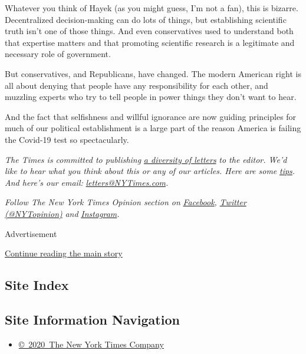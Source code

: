 Whatever you think of Hayek (as you might guess, I'm not a fan), this is
bizarre. Decentralized decision-making can do lots of things, but
establishing scientific truth isn't one of those things. And even
conservatives used to understand both that expertise matters and that
promoting scientific research is a legitimate and necessary role of
government.

But conservatives, and Republicans, have changed. The modern American
right is all about denying that people have any responsibility for each
other, and muzzling experts who try to tell people in power things they
don't want to hear.

And the fact that selfishness and willful ignorance are now guiding
principles for much of our political establishment is a large part of
the reason America is failing the Covid-19 test so spectacularly.

\emph{The Times is committed to publishing}
\href{https://www.nytimes3xbfgragh.onion/2019/01/31/opinion/letters/letters-to-editor-new-york-times-women.html}{\emph{a
diversity of letters}} \emph{to the editor. We'd like to hear what you
think about this or any of our articles. Here are some}
\href{https://help.nytimes3xbfgragh.onion/hc/en-us/articles/115014925288-How-to-submit-a-letter-to-the-editor}{\emph{tips}}\emph{.
And here's our email:}
\href{mailto:letters@NYTimes.com}{\emph{letters@NYTimes.com}}\emph{.}

\emph{Follow The New York Times Opinion section on}
\href{https://www.facebookcorewwwi.onion/nytopinion}{\emph{Facebook}}\emph{,}
\href{http://twitter.com/NYTOpinion}{\emph{Twitter (@NYTopinion)}}
\emph{and}
\href{https://www.instagram.com/nytopinion/}{\emph{Instagram}}\emph{.}

Advertisement

\protect\hyperlink{after-bottom}{Continue reading the main story}

\hypertarget{site-index}{%
\subsection{Site Index}\label{site-index}}

\hypertarget{site-information-navigation}{%
\subsection{Site Information
Navigation}\label{site-information-navigation}}

\begin{itemize}
\tightlist
\item
  \href{https://help.nytimes3xbfgragh.onion/hc/en-us/articles/115014792127-Copyright-notice}{©~2020~The
  New York Times Company}
\end{itemize}


